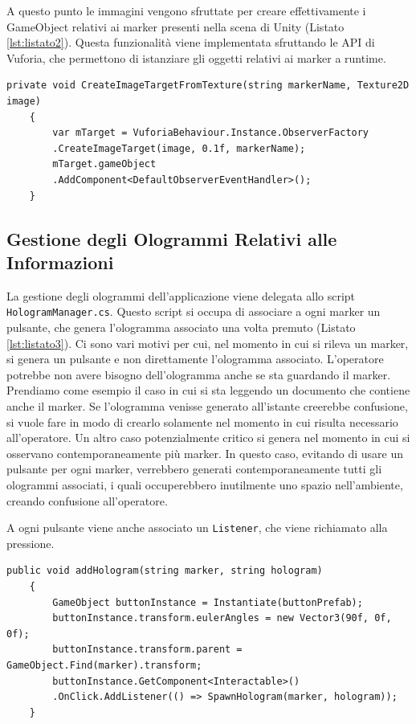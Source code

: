 A questo punto le immagini vengono sfruttate per creare effettivamente i GameObject relativi ai marker presenti nella scena di Unity (Listato \ref{lst:listato2}).
Questa funzionalità viene implementata sfruttando le API di Vuforia, che permettono di istanziare gli oggetti relativi ai marker a runtime.

\lstset{language=[Sharp]C, numbers=left}
\begin{lstlisting}[caption={Metodo richiamato per creare i target in base alle immagini scaricate precedentemente.}, label=lst:listato2]
    private void CreateImageTargetFromTexture(string markerName, Texture2D image)
    {
        var mTarget = VuforiaBehaviour.Instance.ObserverFactory
        .CreateImageTarget(image, 0.1f, markerName);
        mTarget.gameObject
        .AddComponent<DefaultObserverEventHandler>();
    }
\end{lstlisting}

\subsection{Gestione degli Ologrammi Relativi alle Informazioni}
La gestione degli ologrammi dell'applicazione viene delegata allo script \texttt{HologramManager.cs}.
Questo script si occupa di associare a ogni marker un pulsante, che genera l'ologramma associato una volta premuto (Listato \ref{lst:listato3}).
Ci sono vari motivi per cui, nel momento in cui si rileva un marker, si genera un pulsante e non direttamente l'ologramma associato.
L'operatore potrebbe non avere bisogno dell'ologramma anche se sta guardando il marker. Prendiamo come esempio il caso in cui si sta leggendo un documento che contiene anche il marker. Se l'ologramma venisse generato all'istante creerebbe confusione, si vuole fare in modo di crearlo solamente nel momento in cui risulta necessario all'operatore.
Un altro caso potenzialmente critico si genera nel momento in cui si osservano contemporaneamente più marker. In questo caso, evitando di usare un pulsante per ogni marker, verrebbero generati contemporaneamente tutti gli ologrammi associati, i quali occuperebbero inutilmente uno spazio nell'ambiente, creando confusione all'operatore.

A ogni pulsante viene anche associato un \texttt{Listener}, che viene richiamato alla pressione.

\lstset{language=[Sharp]C, numbers=left}
\begin{lstlisting}[caption={Metodo richiamato per associare un bottone ad ogni marker.}, label=lst:listato3]
    public void addHologram(string marker, string hologram)
    {
        GameObject buttonInstance = Instantiate(buttonPrefab);
        buttonInstance.transform.eulerAngles = new Vector3(90f, 0f, 0f);
        buttonInstance.transform.parent = GameObject.Find(marker).transform;
        buttonInstance.GetComponent<Interactable>()
        .OnClick.AddListener(() => SpawnHologram(marker, hologram));
    }
\end{lstlisting}

